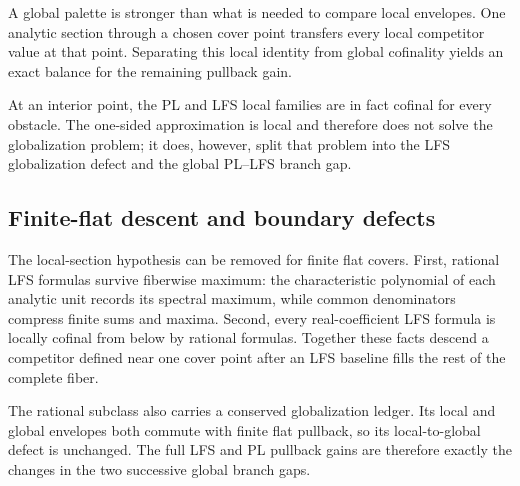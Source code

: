A global palette is stronger than what is needed to compare local envelopes.
One analytic section through a chosen cover point transfers every local
competitor value at that point.  Separating this local identity from global
cofinality yields an exact balance for the remaining pullback gain.




At an interior point, the PL and LFS local families are in fact cofinal for
every obstacle.  The one-sided approximation is local and therefore does not
solve the globalization problem; it does, however, split that problem into
the LFS globalization defect and the global PL--LFS branch gap.




\subsection{Finite-flat descent and boundary defects}
\label{sec:ch15-envelope-finite-flat}

The local-section hypothesis can be removed for finite flat covers.  First,
rational LFS formulas survive fiberwise maximum: the characteristic
polynomial of each analytic unit records its spectral maximum, while common
denominators compress finite sums and maxima.  Second, every real-coefficient
LFS formula is locally cofinal from below by rational formulas.  Together
these facts descend a competitor defined near one cover point after an LFS
baseline fills the rest of the complete fiber.




The rational subclass also carries a conserved globalization ledger.  Its
local and global envelopes both commute with finite flat pullback, so its
local-to-global defect is unchanged.  The full LFS and PL pullback gains are
therefore exactly the changes in the two successive global branch gaps.

